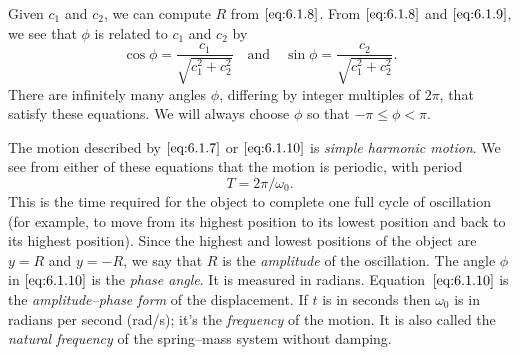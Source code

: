 \documentclass{ximera}
\begin{document}
\begin{center}
\end{center}

 
Given $c_1$ and
$c_2$, we can compute $R$ from $\eqref{eq:6.1.8}$. From $\eqref{eq:6.1.8}$ and
$\eqref{eq:6.1.9}$, we see that $\phi$ is related to $c_1$ and $c_2$ by
$$
\cos\phi=\frac{c_1}{\sqrt{c_1^2+c_2^2}}\quad\mbox{and}\quad\sin\phi=
\frac{c_2}{\sqrt{c_1^2+c_2^2}}.
$$
There are infinitely many angles $\phi$, differing
 by integer multiples of $2\pi$, that satisfy these equations. We
will always choose $\phi$ so that $-\pi\leq\phi<\pi$.
 
 
The motion described by $\eqref{eq:6.1.7}$ or $\eqref{eq:6.1.10}$
is \textit{simple harmonic motion}. We see from either of these equations that the motion is periodic, with period
$$
T=2\pi/\omega_0.
$$
This is the time required for the object to complete one full cycle of
oscillation (for example, to move from its highest position to its
lowest position and back to its highest position). Since the highest
and lowest positions of the object are $y=R$ and $y=-R$, we say that
$R$ is the \textit{amplitude} of the oscillation. The angle $\phi$ in
$\eqref{eq:6.1.10}$ is the \textit{phase angle}. It is measured in radians. Equation~$\eqref{eq:6.1.10}$ is the \textit{amplitude--phase
form} of the displacement. If $t$ is in seconds then $\omega_0$ is
in radians per second (rad/s);   it's  the \textit{frequency} of
the motion. It is also called the \textit{natural frequency} of
the spring--mass system without damping.
 
\end{document}
